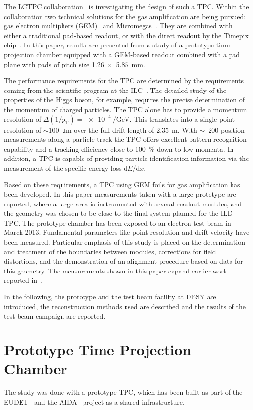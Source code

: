 \documentclass[preprint]{elsarticle}
\begin{document}
The LCTPC collaboration~\cite{LCTPC} is investigating the design of such a TPC. Within the collaboration two technical solutions for the gas amplification are being pursued: gas electron multipliers (GEM)~\cite{GEM} and Micromegas~\cite{MICROMEGAS}. They are combined with either a traditional pad-based readout, or with the direct readout by the Timepix chip~\cite{Llopart:2007}. In this paper, results are presented from a study of a prototype time projection chamber equipped with a GEM-based readout combined with a pad plane with pads of pitch size \SI{1.26 x 5.85}{\mm}. 

The performance requirements for the TPC are determined by the requirements coming from the scientific program at the ILC~\cite{ILCTDR}. The detailed study of the properties of the Higgs boson, for example, requires the precise determination of the momentum of charged particles. The TPC alone has to provide a momentum resolution of $\Delta\left(1/p_{\mathrm{T}}\right) = \SI{e-4}{\per\GeV}$. This translates into a single point resolution of $\sim$\SI{100}{\um} over the full drift length of \SI{2.35}{\m}. With $\sim$~200 position measurements along a particle track the TPC offers excellent pattern recognition capability and a tracking efficiency close to \SI{100}{\percent} down to low momenta. In addition, a TPC is capable of providing particle identification information via the measurement of the specific energy loss $\mathrm{d}E/\mathrm{d}x$.

Based on these requirements, a TPC using GEM foils for gas amplification has been developed. In this paper measurements taken with a large prototype are reported, where a large area is instrumented with several readout modules, and the geometry was chosen to be close to the final system planned for the ILD TPC. The prototype chamber has been exposed to an electron test beam in March 2013. Fundamental parameters like point resolution and drift velocity have been measured. Particular emphasis of this study is placed on the determination and treatment of the boundaries between modules, corrections for field distortions, and the demonstration of an alignment procedure based on data for this geometry. The measurements shown in this paper expand earlier work reported in~\cite{DESYGEM}.

In the following, the prototype and the test beam facility at DESY are introduced,  the reconstruction methods used are described 
and the results of the test beam campaign are reported.


\section{Prototype Time Projection Chamber}
The study was done with a prototype TPC, which has been built as part of the EUDET~\cite{EUDET} and the AIDA~\cite{AIDA} project as a shared infrastructure. 
\end{document}
